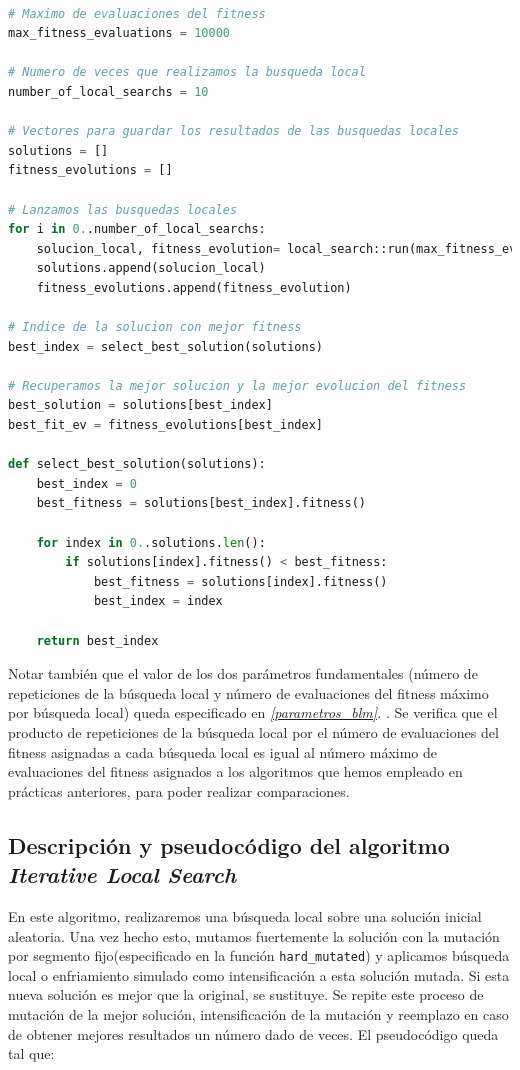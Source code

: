 \documentclass[11pt]{article}
\begin{document}
\begin{lstlisting}[language=Python, style=Boxed]

# Maximo de evaluaciones del fitness
max_fitness_evaluations = 10000

# Numero de veces que realizamos la busqueda local
number_of_local_searchs = 10

# Vectores para guardar los resultados de las busquedas locales
solutions = []
fitness_evolutions = []

# Lanzamos las busquedas locales
for i in 0..number_of_local_searchs:
    solucion_local, fitness_evolution= local_search::run(max_fitness_evaluations)
    solutions.append(solucion_local)
    fitness_evolutions.append(fitness_evolution)

# Indice de la solucion con mejor fitness
best_index = select_best_solution(solutions)

# Recuperamos la mejor solucion y la mejor evolucion del fitness
best_solution = solutions[best_index]
best_fit_ev = fitness_evolutions[best_index]

def select_best_solution(solutions):
    best_index = 0
    best_fitness = solutions[best_index].fitness()

    for index in 0..solutions.len():
        if solutions[index].fitness() < best_fitness:
            best_fitness = solutions[index].fitness()
            best_index = index

    return best_index
\end{lstlisting}

Notar también que el valor de los dos parámetros fundamentales (número de repeticiones de la búsqueda local y número de evaluaciones del fitness máximo por búsqueda local) queda especificado en \emph{\ref{parametros_blm}. }. Se verifica que el producto de repeticiones de la búsqueda local por el número de evaluaciones del fitness asignadas a cada búsqueda local es igual al número máximo de evaluaciones del fitness asignados a los algoritmos que hemos empleado en prácticas anteriores, para poder realizar comparaciones.

\pagebreak

\subsection{Descripción y pseudocódigo del algoritmo \emph{Iterative Local Search}}

En este algoritmo, realizaremos una búsqueda local sobre una solución inicial aleatoria. Una vez hecho esto, mutamos fuertemente la solución con la mutación por segmento fijo(especificado en la función \lstinline{hard_mutated}) y aplicamos búsqueda local o enfriamiento simulado como intensificación a esta solución mutada. Si esta nueva solución es mejor que la original, se sustituye. Se repite este proceso de mutación de la mejor solución, intensificación de la mutación y reemplazo en caso de obtener mejores resultados un número dado de veces. El pseudocódigo queda tal que:
\end{document}
